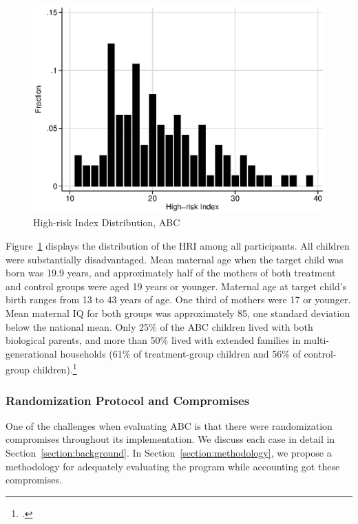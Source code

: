 \begin{center}
	\begin{figure}[H]
		\caption{High-risk Index Distribution, ABC} \label{figure:hridistabc}
		\centering
		\includegraphics[width=.9\columnwidth]{output/abc_hri.eps}
	\end{figure}
\end{center}

\noindent Figure~\ref{figure:hridistabc} displays the distribution of the HRI among all participants. All children were substantially disadvantaged. Mean maternal age when the target child was born was 19.9 years, and approximately half of the mothers of both treatment and control groups were aged 19 years or younger. Maternal age at target child's birth ranges from 13 to 43 years of age. One third of mothers were 17 or younger. Mean maternal IQ for both groups was approximately 85, one standard deviation below the national mean. Only 25\% of the ABC children lived with both biological parents, and more than 50\% lived with extended families in multi-generational households (61\% of treatment-group children and 56\% of control-group children).\footnote{\citet{Ramey_Campbell_1991_childreninpoverty,Campbell_Ramey_1994_CD}.}\\

\subsubsection{Randomization Protocol and Compromises}

\noindent One of the challenges when evaluating ABC is that there were randomization compromises throughout its implementation. We discuss each case in detail in Section~\ref{section:background}. In Section~\ref{section:methodology},  we propose a methodology for adequately evaluating the program while accounting got these compromises.

